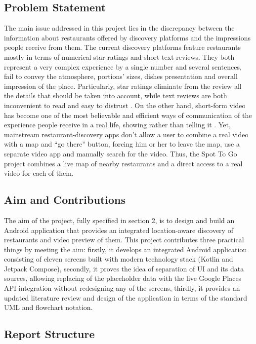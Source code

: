 \documentclass[12pt, a4paper]{article}
\begin{document}
\subsection{Problem Statement}

The main issue addressed in this project lies in the discrepancy between the information about restaurants offered by discovery platforms and the impressions people receive from them. The current discovery platforms feature restaurants mostly in terms of numerical star ratings and short text reviews. They both represent a very complex experience by a single number and several sentences, fail to convey the atmosphere, portions' sizes, dishes presentation and overall impression of the place. Particularly, star ratings eliminate from the review all the details that should be taken into account, while text reviews are both inconvenient to read and easy to distrust \citep{dellarocas2003, cheung2009}. On the other hand, short-form video has become one of the most believable and efficient ways of communication of the experience people receive in a real life, showing rather than telling it \citep{kaplan2010, montag2021}. Yet, mainstream restaurant-discovery apps don't allow a user to combine a real video with a map and ``go there'' button, forcing him or her to leave the map, use a separate video app and manually search for the video. Thus, the Spot To Go project combines a live map of nearby restaurants and a direct access to a real video for each of them.

\subsection{Aim and Contributions}

The aim of the project, fully specified in section 2, is to design and build an Android application that provides an integrated location-aware discovery of restaurants and video preview of them. This project contributes three practical things by meeting the aim: firstly, it develops an integrated Android application consisting of eleven screens built with modern technology stack (Kotlin and Jetpack Compose), secondly, it proves the idea of separation of UI and its data sources, allowing replacing of the placeholder data with the live Google Places API integration without redesigning any of the screens, thirdly, it provides an updated literature review and design of the application in terms of the standard UML and flowchart notation.

\subsection{Report Structure}
\end{document}
